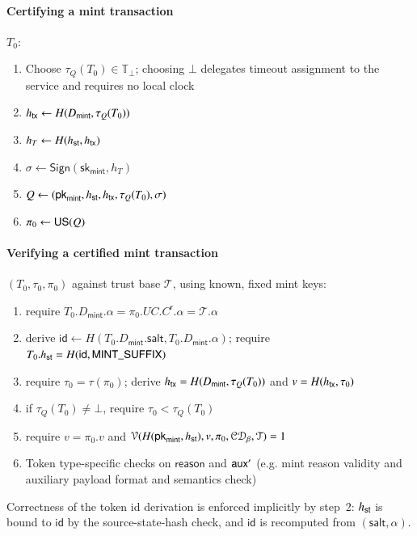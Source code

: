 \paragraph{Certifying a mint transaction} $T_0$:
\begin{enumerate}
	\item Choose $\tau_Q(T_0)\in\mathbb{T}_\bot$; choosing $\bot$ delegates timeout assignment to the service and requires no local clock
	\item ${h_\mathsf{tx}} \gets H(D_\mathsf{mint}, \tau_Q(T_0))$
	\item $h_T \gets H({h_\mathsf{st}}, {h_\mathsf{tx}})$
	\item $\sigma \gets \mathsf{Sign}(\mathsf{sk}_\mathsf{mint}, h_T)$
	\item $Q \gets (\mathsf{pk}_\mathsf{mint}, {h_\mathsf{st}}, {h_\mathsf{tx}}, \tau_Q(T_0), \sigma)$
	\item $\pi_0 \gets \mathsf{US}(Q)$
\end{enumerate}

\paragraph{Verifying a certified mint transaction} $(T_0, \tau_0, \pi_0)$ against trust base $\mathcal{T}$, using known, fixed mint keys:
\begin{enumerate}
	\item require $T_0.D_\mathsf{mint}.\alpha = \pi_0.UC.C^\mathsf{r}.\alpha = \mathcal{T}.\alpha$
	\item derive $\mathsf{id} \gets H(T_0.D_\mathsf{mint}.\mathsf{salt}, T_0.D_\mathsf{mint}.\alpha)$;\; require $T_0.{h_\mathsf{st}} = H(\mathsf{id}, \mathsf{MINT\_SUFFIX})$
	\item require $\tau_0=\tau(\pi_0)$; derive ${h_\mathsf{tx}}=H(D_\mathsf{mint},\tau_Q(T_0))$ and $v=H({h_\mathsf{tx}},\tau_0)$
	\item if $\tau_Q(T_0)\ne\bot$, require $\tau_0 < \tau_Q(T_0)$
	\item require $v = \pi_0.v$ and $\mathcal{V}(H(\mathsf{pk}_\mathsf{mint}, {h_\mathsf{st}}), v, \pi_0, \mathcal{CD}_\beta, \mathcal{T}) = 1$
	\item Token type-specific checks on $\mathsf{reason}$ and $\mathsf{aux}'$ (e.g. mint reason validity and auxiliary payload format and semantics check)
\end{enumerate}

Correctness of the token id derivation is enforced implicitly by step~2: ${h_\mathsf{st}}$ is bound to $\mathsf{id}$ by the source-state-hash check, and $\mathsf{id}$ is recomputed from $(\mathsf{salt}, \alpha)$.


